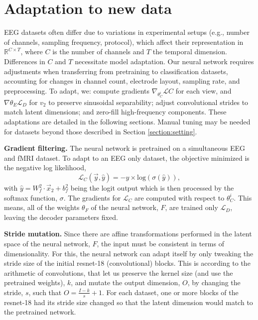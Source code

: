 \documentclass{article}
\begin{document}
\section{Adaptation to new data}\label{section:adaptation}

EEG datasets often differ due to variations in experimental setups (e.g., number of channels, sampling frequency, protocol), which affect their representation in $\mathbb{R}^{C \times T}$, where $C$ is the number of channels and $T$ the temporal dimension. Differences in $C$ and $T$ necessitate model adaptation. 
Our neural network requires adjustments when transferring from pretraining to classification datasets, accounting for changes in channel count, electrode layout, sampling rate, and preprocessing. To adapt, we: compute gradients $\nabla_{\theta_C^i} \mathcal{L}C$ for each view, and $\nabla{\theta_E} \mathcal{L}_D$ for $v_2$ to preserve sinusoidal separability; adjust convolutional strides to match latent dimensions; and zero-fill high-frequency components. 
These adaptations are detailed in the following sections. Manual tuning may be needed for datasets beyond those described in Section \ref{section:setting}.

\noindent\textbf{Gradient filtering.}\label{appendix:gradient_filtering} 
The neural network is pretrained on a simultaneous EEG and fMRI dataset. To adapt to an EEG only dataset, the objective minimized is the negative log likelihood,
\begin{equation}\label{equation:nll}
    \mathcal{L}_C(\vec{y}, \hat{y}) = -y \times \mbox{log}(\sigma(\hat{y})),
\end{equation}
\noindent with $\hat{y} = W_f^2 \cdot \vec{x}_2 + b_f^2$ being the logit output which is then processed by the softmax function, $\sigma$. The gradients for $\mathcal{L}_C$ are computed with respect to $\theta_C^i$. This means, all of the weights $\theta_F$ of the neural network, $F$, are trained only $\mathcal{L}_D$, leaving the decoder parameters fixed.

\noindent\textbf{Stride mutation.}\label{appendix:stride_mutation} 
Since there are affine transformations performed in the latent space of the neural network, $F$, the input must be consistent in terms of dimensionality. For this, the neural network can adapt itself by only tweaking the stride size of the initial resnet-18 (convolutional) blocks. This is according to the arithmetic of convolutions, that let us preserve the kernel size (and use the pretrained weights), $k$, and mutate the output dimension, $O$, by changing the stride, $s$, such that $O=\frac{I-k}{s}+1$. For each dataset, one or more blocks of the resnet-18 had its stride size changed so that the latent dimension would match to the pretrained network.
\end{document}
